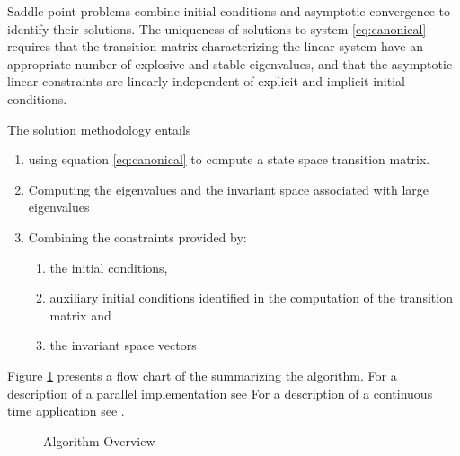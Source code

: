 \documentclass{article}
\begin{document}
{%




Saddle point problems combine initial conditions and asymptotic 
convergence to identify their solutions.
The uniqueness of solutions to 
system  \ref{eq:canonical} requires that
the transition matrix characterizing the linear system have an appropriate
number of explosive and stable eigenvalues\cite{blanchard80},
and that the asymptotic linear constraints 
are linearly independent of explicit and implicit initial 
conditions\cite{ANDER:AIM2}.

The solution methodology entails 
\begin{enumerate}
\item using equation \ref{eq:canonical} to
compute a state space transition matrix.
\item Computing the eigenvalues and the invariant space associated with
large eigenvalues
\item Combining the constraints provided by:
  \begin{enumerate}
  \item the
initial conditions,
\item  auxiliary initial conditions identified in the computation of the transition matrix and 
\item the invariant space vectors
  \end{enumerate}
\end{enumerate}

Figure \ref{fig:overview} presents a flow chart of the summarizing the
algorithm. For a description of a parallel implementation see \cite{ANDER:PARA}
For a description of a continuous time application see \cite{anderson97}.

\begin{figure}[htbp]
  \begin{center}
    \leavevmode
{}   \caption{Algorithm Overview}
    \label{fig:overview}
  \end{center}
\end{figure}

}
\end{document}
